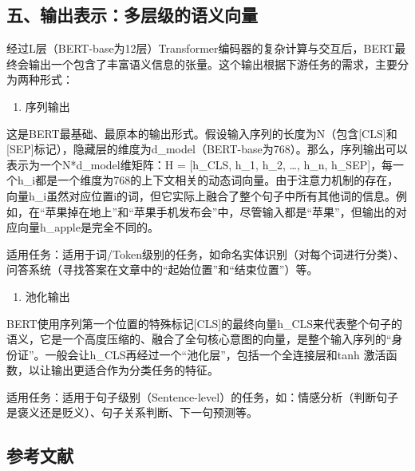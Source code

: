 \hypertarget{ux4e94ux8f93ux51faux8868ux793aux591aux5c42ux7ea7ux7684ux8bedux4e49ux5411ux91cf}{%
\subsection{五、输出表示：多层级的语义向量}\label{ux4e94ux8f93ux51faux8868ux793aux591aux5c42ux7ea7ux7684ux8bedux4e49ux5411ux91cf}}

经过L层（BERT-base为12层）Transformer编码器的复杂计算与交互后，BERT最终会输出一个包含了丰富语义信息的张量。这个输出根据下游任务的需求，主要分为两种形式：

\begin{enumerate}
\def\labelenumi{\arabic{enumi}.}
\tightlist
\item
  序列输出
\end{enumerate}

这是BERT最基础、最原本的输出形式。假设输入序列的长度为N（包含{[}CLS{]}和{[}SEP{]}标记），隐藏层的维度为d\_model（BERT-base为768）。那么，序列输出可以表示为一个N*d\_model维矩阵：H = {[}h\_CLS, h\_1, h\_2, \ldots, h\_n, h\_SEP{]}，每一个h\_i都是一个维度为768的上下文相关的动态词向量。由于注意力机制的存在，向量h\_i虽然对应位置i的词，但它实际上融合了整个句子中所有其他词的信息。例如，在``苹果掉在地上''和``苹果手机发布会''中，尽管输入都是``苹果''，但输出的对应向量h\_apple是完全不同的。

适用任务：适用于词/Token级别的任务，如命名实体识别（对每个词进行分类）、问答系统（寻找答案在文章中的``起始位置''和``结束位置''）等。

\begin{enumerate}
\def\labelenumi{\arabic{enumi}.}
\setcounter{enumi}{1}
\tightlist
\item
  池化输出
\end{enumerate}

BERT使用序列第一个位置的特殊标记{[}CLS{]}的最终向量h\_CLS来代表整个句子的语义，它是一个高度压缩的、融合了全句核心意图的向量，是整个输入序列的``身份证''。一般会让h\_CLS再经过一个``池化层''，包括一个全连接层和tanh 激活函数，以让输出更适合作为分类任务的特征。

适用任务：适用于句子级别（Sentence-level）的任务，如：情感分析（判断句子是褒义还是贬义）、句子关系判断、下一句预测等。

\hypertarget{ux53c2ux8003ux6587ux732e-71}{%
\subsection{参考文献}\label{ux53c2ux8003ux6587ux732e-71}}

